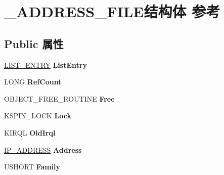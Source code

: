 \hypertarget{struct___a_d_d_r_e_s_s___f_i_l_e}{}\section{\+\_\+\+A\+D\+D\+R\+E\+S\+S\+\_\+\+F\+I\+L\+E结构体 参考}
\label{struct___a_d_d_r_e_s_s___f_i_l_e}
\subsection*{Public 属性}
\begin{DoxyCompactItemize}
\item 
\mbox{\label{struct___a_d_d_r_e_s_s___f_i_l_e_adb6402d0610102cf4adc8809f6ddfcb6}} 
\hyperlink{struct___l_i_s_t___e_n_t_r_y}{L\+I\+S\+T\+\_\+\+E\+N\+T\+RY} {\bfseries List\+Entry}
\item 
\mbox{\label{struct___a_d_d_r_e_s_s___f_i_l_e_a7951b1493ad03da5a0a83319e2a85074}} 
L\+O\+NG {\bfseries Ref\+Count}
\item 
\mbox{\label{struct___a_d_d_r_e_s_s___f_i_l_e_a66021fc0188ded57e0c07c9d72d68712}} 
O\+B\+J\+E\+C\+T\+\_\+\+F\+R\+E\+E\+\_\+\+R\+O\+U\+T\+I\+NE {\bfseries Free}
\item 
\mbox{\label{struct___a_d_d_r_e_s_s___f_i_l_e_ad24c87e620ecb90f932d58b84a5d9047}} 
K\+S\+P\+I\+N\+\_\+\+L\+O\+CK {\bfseries Lock}
\item 
\mbox{\label{struct___a_d_d_r_e_s_s___f_i_l_e_a2f8a2b72cb93321a2b92e308abf60882}} 
K\+I\+R\+QL {\bfseries Old\+Irql}
\item 
\mbox{\label{struct___a_d_d_r_e_s_s___f_i_l_e_a53a1a34bcca05c27c97609b3bbdd57dd}} 
\hyperlink{struct_i_p___a_d_d_r_e_s_s}{I\+P\+\_\+\+A\+D\+D\+R\+E\+SS} {\bfseries Address}
\item 
\mbox{\label{struct___a_d_d_r_e_s_s___f_i_l_e_a49eee8611da882264322ce377b64e67f}} 
U\+S\+H\+O\+RT {\bfseries Family}
\item 
\mbox{\label{struct___a_d_d_r_e_s_s___f_i_l_e_ac5915bcfe07670998f5bc993c6f5515b}} 

\end{DoxyCompactItemize}
